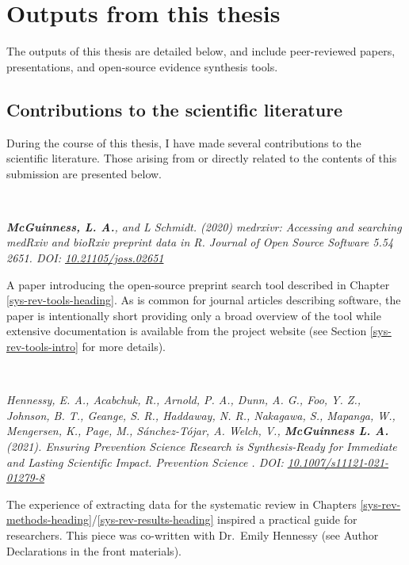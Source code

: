 \documentclass[a4paper, twoside]{templates/ociamthesis}
\begin{document}
\hypertarget{thesis-output}{%
\section{Outputs from this thesis}\label{thesis-output}}

The outputs of this thesis are detailed below, and include peer-reviewed papers, presentations, and open-source evidence synthesis tools.

\hypertarget{contributions-to-the-scientific-literature}{%
\subsection{Contributions to the scientific literature}\label{contributions-to-the-scientific-literature}}

During the course of this thesis, I have made several contributions to the scientific literature. Those arising from or directly related to the contents of this submission are presented below.

~

\emph{\textbf{McGuinness, L. A.}, and L Schmidt. (2020) medrxivr: Accessing and searching medRxiv and bioRxiv preprint data in R. Journal of Open Source Software 5.54 2651. DOI: \href{https://doi.org/10.21105/joss.02651}{10.21105/joss.02651}}

A paper introducing the open-source preprint search tool described in Chapter \ref{sys-rev-tools-heading}. As is common for journal articles describing software, the paper is intentionally short providing only a broad overview of the tool while extensive documentation is available from the project website (see Section \ref{sys-rev-tools-intro} for more details).

~

\emph{Hennessy, E. A., Acabchuk, R., Arnold, P. A., Dunn, A. G., Foo, Y. Z., Johnson, B. T., Geange, S. R., Haddaway, N. R., Nakagawa, S., Mapanga, W., Mengersen, K., Page, M., Sánchez-Tójar, A. Welch, V., \textbf{McGuinness L. A.} (2021). Ensuring Prevention Science Research is Synthesis-Ready for Immediate and Lasting Scientific Impact. Prevention Science . DOI: \href{https://doi.org/10.1007/s11121-021-01279-8}{10.1007/s11121-021-01279-8}}

The experience of extracting data for the systematic review in Chapters \ref{sys-rev-methods-heading}/\ref{sys-rev-results-heading} inspired a practical guide for researchers. This piece was co-written with Dr.~Emily Hennessy (see Author Declarations in the front materials).
\end{document}
